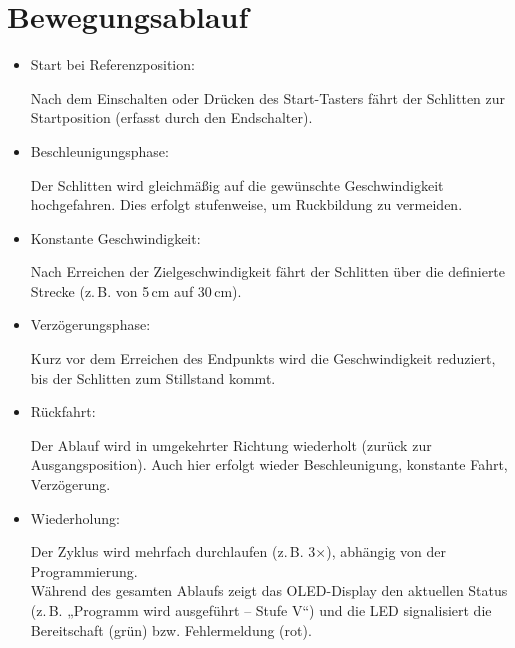 \documentclass[a4paper,12pt]{report}
\begin{document}
	\section{Bewegungsablauf}
	\begin{itemize}[leftmargin=1.5em]
		Der Bewegungsablauf demonstriert die Fähigkeit eines Schrittmotors, präzise, wiederholbare Bewegungen mit einstellbaren Geschwindigkeiten durchzuführen. Dabei wird der Schlitten des Motors entlang der Linearführung hin- und herbewegt. Das Verhalten folgt einem klar strukturierten Zyklus: \\[0,75cm]
		
		\textbf{Ablaufstruktur pro Stufe:}
		
		\item Start bei Referenzposition:
		
		Nach dem Einschalten oder Drücken des Start-Tasters fährt der Schlitten zur Startposition (erfasst durch den Endschalter). \\
		
		\item Beschleunigungsphase:
		
		Der Schlitten wird gleichmäßig auf die gewünschte Geschwindigkeit hochgefahren. Dies erfolgt stufenweise, um Ruckbildung zu vermeiden. \\
		
		\item Konstante Geschwindigkeit: 
		
		Nach Erreichen der Zielgeschwindigkeit fährt der Schlitten über die definierte Strecke (z. B. von 5 cm auf 30 cm). \\
		
		\item Verzögerungsphase: 
		
		Kurz vor dem Erreichen des Endpunkts wird die Geschwindigkeit reduziert, bis der Schlitten zum Stillstand kommt. \\
		
		\item Rückfahrt: 
		
		Der Ablauf wird in umgekehrter Richtung wiederholt (zurück zur Ausgangsposition). Auch hier erfolgt wieder Beschleunigung, konstante Fahrt, Verzögerung. \\
		
		\item Wiederholung: 
		
		Der Zyklus wird mehrfach durchlaufen (z. B. 3×), abhängig von der Programmierung.\\ 
		
		Während des gesamten Ablaufs zeigt das OLED-Display den aktuellen Status (z. B. „Programm wird ausgeführt – Stufe V“) und die LED signalisiert die Bereitschaft (grün) bzw. Fehlermeldung (rot). \\
		
	\end{itemize}
	
\end{document}
